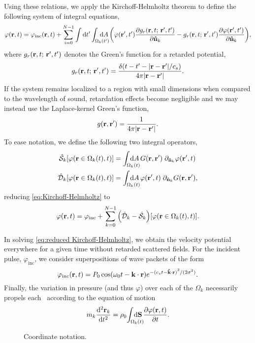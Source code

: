 Using these relations, we apply the Kirchoff-Helmholtz theorem to define the following system of integral equations,
\begin{equation}
  \varphi(\vb{r}, t) = \varphi_\text{inc}(\vb{r}, t) + \sum_{i = 0}^{N - 1}
  \int \dd{t'} \int_{\Omega_k(t')} \mkern-30mu \dd{A}
\qty(
\varphi(\vb{r}',t') \pdv{\ensuremath{g_r(\vb{r}, t; \, \vb{r}', t')}}{\vu{n}_k} - g_r(\vb{r}, t; \, \vb{r}', t') \pdv{\varphi(\vb{r}',t')}{\vu{n}_k}),
  \label{eq:Kirchoff-Helmholtz}
\end{equation}
where $g_r(\vb{r}, t; \, \vb{r}', t')$ denotes the Green's function for a retarded potential, 
\begin{equation}
  g_r(\vb{r}, t; \, \vb{r}', t') = \frac{\delta\qty(t - t' - \abs{\vb{r}-\vb{r}'}/c_s)}{4\pi \abs{\vb{r}-\vb{r}'}}.
  \label{eq:retarded green's function}
\end{equation}
If the system remains localized to a region with small dimensions when compared to the wavelength of sound, retardation effects become negligible and we may instead use the Laplace-kernel Green's function,
\begin{equation}
  g\qty(\vb{r}, \vb{r}') = \frac{1}{4\pi\abs{\vb{r} - \vb{r}'}}.
  \label{eq:green's function}
\end{equation}
To ease notation, we define the following two integral operators,
\begin{subequations}
\begin{align}
  \hat{\mathcal{S}}_k\qty[\varphi(\vb{r} \in \Omega_k(t), t)] &= \int_{\Omega_k(t)} \mkern-30mu \dd{A} G(\vb{r}, \vb{r}') \; \partial_{\vu{n}_k} \varphi(\vb{r}',t) 
  \label{eq:single layer}\\
  \hat{\mathcal{D}}_k\qty[\varphi(\vb{r} \in \Omega_k(t), t)] &= \int_{\Omega_k(t)} \mkern-30mu \dd{A} \varphi(\vb{r}',t) \; \partial_{\vu{n}_k} G(\vb{r}, \vb{r}'), \label{eq:double layer}
\end{align}
  \label{eq:operator_kirchoff}
\end{subequations}
reducing \cref{eq:Kirchoff-Helmholtz} to
\begin{equation}
  \varphi(\vb{r},t) = \varphi_\text{inc} + \sum_{k = 0}^{N - 1} \qty(\hat{\mathcal{D}}_k - \hat{\mathcal{S}}_k)\qty[\varphi(\vb{r} \in \Omega_k(t), t)].
  \label{eq:reduced Kirchoff-Helmholtz}
\end{equation}

In solving \cref{eq:reduced Kirchoff-Helmholtz}, we obtain the velocity potential everywhere for a given time without retarded scattered fields.
For the incident pulse, $\varphi_\text{inc}$, we consider superpositions of wave packets of the form
\begin{equation}
  \varphi_\text{inc}(\vb{r}, t) = P_0\cos(\omega_0 t - \vb{k}\cdot\vb{r})e^{-{(c_s t - \vu{k}\cdot\vb{r})}^2/(2 \sigma^2)}.
  \label{eq:inc_field}
\end{equation}
Finally, the variation in pressure (and thus $\varphi$) over each of the $\Omega_k$ necessarily propels each \bubble\ according to the equation of motion
\begin{equation}
  m_k \dv[2]{\vb{r}_k}{t} = \rho_0 \! \int_{\Omega_k(t)} \mkern-30mu \dd{\vb{S}} \pdv{\varphi\qty(\vb{r}, t)}{t}.
  \label{eq:Newton}
\end{equation}

\begin{figure}[t]
  \centering
  \caption{\label{fig:diagram}Coordinate notation.}
\end{figure}

